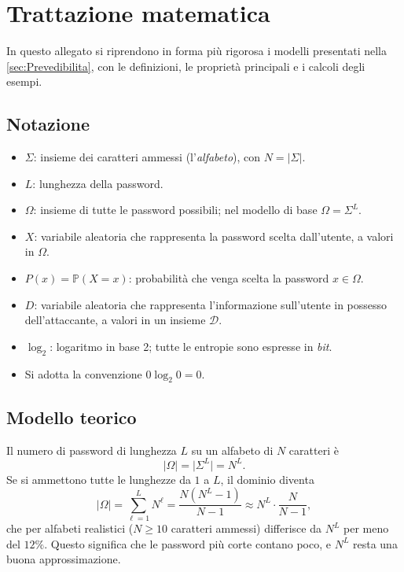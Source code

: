 \section{Trattazione matematica}\label{app:TrattazioneMatematica}
In questo allegato si riprendono in forma più rigorosa i modelli presentati nella \cref{sec:Prevedibilita}, con le definizioni, le proprietà principali e i calcoli degli esempi.

\subsection{Notazione}\label{app:Notazione}
\begin{itemize}
    \item \(\Sigma\): insieme dei caratteri ammessi (l'\emph{alfabeto}), con \(N = \vert\Sigma\vert\).
    \item \(L\): lunghezza della password.
    \item \(\Omega\): insieme di tutte le password possibili; nel modello di base \(\Omega = \Sigma^L\).
    \item \(X\): variabile aleatoria che rappresenta la password scelta dall'utente, a valori in \(\Omega\).
    \item \(P(x) = \mathbb{P}(X = x)\): probabilità che venga scelta la password \(x \in \Omega\).
    \item \(D\): variabile aleatoria che rappresenta l'informazione sull'utente in possesso dell'attaccante, a valori in un insieme \(\mathcal{D}\).
    \item \(\log_2\): logaritmo in base 2; tutte le entropie sono espresse in \emph{bit}.
    \item Si adotta la convenzione \(0 \log_2 0 = 0\).
\end{itemize}

\subsection{Modello teorico}\label{app:ModelloTeorico}
Il numero di password di lunghezza \(L\) su un alfabeto di \(N\) caratteri è
\[
    \vert\Omega\vert = \vert\Sigma^L\vert = N^L.
\]
Se si ammettono tutte le lunghezze da \(1\) a \(L\), il dominio diventa
\[
    \vert\Omega\vert = \sum_{\ell=1}^{L} N^\ell = \frac{N(N^L - 1)}{N - 1} \approx N^L \cdot \frac{N}{N-1},
\]
che per alfabeti realistici (\(N \geq 10\) caratteri ammessi) differisce da \(N^L\) per meno del \(12\%\). Questo significa che le password più corte contano poco, e \(N^L\) resta una buona approssimazione.

